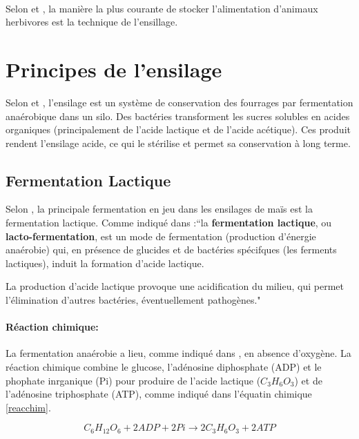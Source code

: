 \documentclass[12pt,a4paper]{report}
\begin{document}
\paragraph{} Selon \cite{wikipedia_ensilage_2018} et \cite{cuvelier_lalimentation_2015}, la manière la plus courante de stocker l'alimentation d'animaux herbivores est la technique de l'ensillage.


\section{Principes de l'ensilage}

Selon \cite{wikipedia_ensilage_2018} et \cite{cuvelier_lalimentation_2015}, l’ensilage est un système de conservation des fourrages par fermentation anaérobique dans un silo. Des bactéries transforment les sucres solubles en acides organiques (principalement de l'acide lactique et de l’acide acétique). Ces produit rendent l'ensilage acide, ce qui le stérilise et permet sa conservation à long terme.

\subsection{Fermentation Lactique}
Selon \cite{wikipedia_ensilage_2018}, la principale fermentation en jeu dans les ensilages de maïs est la fermentation lactique. Comme indiqué dans \cite{wikipedia_fermentation_2018} :“la \textbf{fermentation lactique}, ou \textbf{lacto-fermentation}, est un mode de fermentation (production d'énergie anaérobie) qui, en présence de glucides et de bactéries spécifques (les ferments lactiques), induit la formation d'acide lactique.

La production d'acide lactique provoque une acidification du milieu, qui permet l'élimination d'autres bactéries, éventuellement pathogènes."

\paragraph{Réaction chimique:} La fermentation anaérobie a lieu, comme indiqué dans \cite{wikipedia_fermentation_2018}, en absence d'oxygène. La réaction chimique combine le glucose, l'adénosine diphosphate (ADP) et le phophate inrganique (Pi) pour produire de l'acide lactique ($C_3H_6O_3$) et de l'adénosine triphosphate (ATP), comme indiqué dans l'équatin chimique \ref{reacchim}.

\begin{equation}
	C_6H_{12}O_6 + 2 ADP + 2 Pi \rightarrow 2 C_3H_6O_3 + 2 ATP
	\label{reacchim}
\end{equation}
\end{document}
